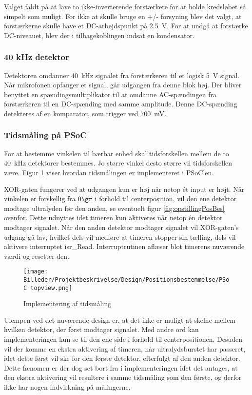 Valget faldt på at lave to ikke-inverterende forstærkere for at holde kredsløbet så simpelt som muligt. For ikke at skulle bruge en +/- forsyning blev det valgt, at forstærkerne skulle have et DC-arbejdspunkt på \SI{2,5}{V}. For at undgå at forstærke DC-niveauet, blev der i tilbagekoblingen indsat en kondensator.

\subsubsection*{40 kHz detektor}
Detektoren omdanner \SI{40}{kHz} signalet fra forstærkeren til et logisk \SI{5}{V} signal. Når mikrofonen opfanger et signal, går udgangen fra denne blok høj.
Der bliver benyttet en spændingsmultiplikator til at omdanne AC-spændingen fra forstærkeren til en DC-spænding med samme amplitude. Denne DC-spænding detekteres af en komparator, som trigger ved \SI{700}{mV}.

\subsubsection*{Tidsmåling på PSoC}
For at bestemme vinkelen til bærbar enhed skal tidsforskellen mellem de to \SI{40}{kHz} detektorer bestemmes. Jo større vinkel desto større vil tidsforskellen være. Figur \ref{fig:PSoC_Topview} viser hvordan tidsmålingen er implementeret i PSoC'en.

XOR-gaten fungerer ved at udgangen kun er høj når netop ét input er højt. Når vinkelen er forskellig fra $0\gr$ i forhold til centerposition, vil den ene detektor modtage ultralyden før den anden, se eventuelt figur \ref{fig:opstillingPosBes} ovenfor. Dette udnyttes idet timeren kun aktiveres når netop én detektor modtager signalet.\newline
Når den anden detektor modtager signalet vil XOR-gaten's udgang gå lav, hvilket dels vil medføre at timeren stopper sin tælling, dels vil aktivere interruptet isr\_Read. Interruptrutinen aflæser blot timerens nuværende værdi og resetter den.

\begin{figure}[htb]
	\centering
	\texttt{[image: Billeder/Projektbeskrivelse/Design/Positionsbestemmelse/PSoC topview.png]}
	\caption{Implementering af tidsmåling}
	\label{fig:PSoC_Topview}
\end{figure}

Ulempen ved det nuværende design er, at det ikke er muligt at skelne mellem hvilken detektor, der først modtager signalet. Med andre ord kan implementeringen kun se til den ene side i forhold til centerpositionen.\newline
Desuden vil der komme en ekstra aktivering af timeren, når ultralydsburstet har passeret, idet dette først vil ske for den første detektor, efterfulgt af den anden detektor. Dette fænomen er der dog set bort fra i implementeringen idet det antages, at den ekstra aktivering vil resultere i samme tidsmåling som den første, og derfor ikke har nogen indvirkning på målingerne.